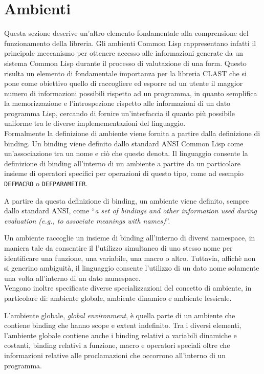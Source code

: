 \section{Ambienti}
\label{environments}

Questa sezione descrive un'altro elemento fondamentale alla comprensione del
funzionamento della libreria. Gli ambienti Common Lisp rappresentano infatti
il principale meccanismo per ottenere accesso alle informazioni generate da un
sistema Common Lisp durante il processo di valutazione di una form. Questo
risulta un elemento di fondamentale importanza per la libreria CLAST che si pone
come obiettivo quello di raccogliere ed esporre ad un utente il maggior numero
di informazioni possibili rispetto ad un programma, in quanto semplifica la
memorizzazione e l'introspezione rispetto alle informazioni di un dato programma
Lisp, cercando di fornire un'interfaccia il quanto più possibile uniforme tra le
diverse implemementazioni del linguaggio.\\

Formalmente la definizione di ambiente viene fornita a partire dalla definizione
di binding. Un binding viene definito dallo standard ANSI Common Lisp come
un'associazione tra un nome e ciò che questo denota. Il linguaggio consente la
definizione di binding all'interno di un ambiente a partire da un particolare
insieme di operatori specifici per operazioni di questo tipo, come ad esempio
\texttt{DEFMACRO} o \texttt{DEFPARAMETER}.

A partire da questa definizione di binding, un ambiente viene definito,
sempre dallo standard ANSI, come \enquote{\textit{a set of bindings and other
information used during evaluation (e.g., to associate meanings with names)}}.

Un ambiente raccoglie un insieme di binding all'interno di diversi namespace,
in maniera tale da consentire il l'utilizzo simultaneo di uno stesso nome per
identificare una funzione, una variabile, una macro o altro. Tuttavia, affichè
non si generino ambiguità, il linguaggio consente l'utilizzo di un dato nome
solamente una volta all'interno di un dato namespace.\\

Vengono inoltre specificate diverse specializzazioni del concetto di ambiente,
in particolare di: ambiente globale, ambiente dinamico e ambiente lessicale.

L'ambiente globale, \textit{global environment}, è quella parte di un ambiente
che contiene binding che hanno scope e extent indefinito. Tra i diversi
elementi, l'ambiente globale contiene anche i binding relativi a variabili
dinamiche e costanti, binding relativi a funzione, macro e operatori speciali
oltre che informazioni relative alle proclamazioni che occorrono all'interno di
un programma.


